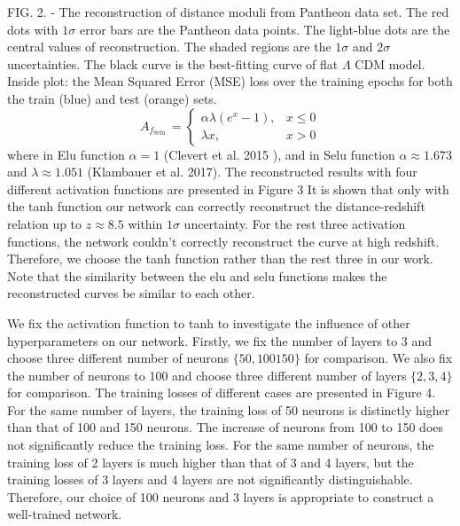 \documentclass[10pt, a4paper]{article}
\begin{document}
FIG. 2. - The reconstruction of distance moduli from Pantheon data set. The red dots with $1 \sigma$ error bars are the Pantheon data points. The light-blue dots are the central values of reconstruction. The shaded regions are the $1 \sigma$ and $2 \sigma$ uncertainties. The black curve is the best-fitting curve of flat $\Lambda$ CDM model. Inside plot: the Mean Squared Error (MSE) loss over the training epochs for both the train (blue) and test (orange) sets.
$$
A_{f_{\text {Selu }}}= \begin{cases}\alpha \lambda\left(e^{x}-1\right), & x \leq 0 \\ \lambda x, & x>0\end{cases}
$$
where in Elu function $\alpha=1$ (Clevert et al. 2015 ), and in Selu function $\alpha \approx 1.673$ and $\lambda \approx 1.051$ (Klambauer et al. 2017). The reconstructed results with four different activation functions are presented in Figure 3 It is shown that only with the tanh function our network can correctly reconstruct the distance-redshift relation up to $z \approx 8.5$ within $1 \sigma$ uncertainty. For the rest three activation functions, the network couldn't correctly reconstruct the curve at high redshift. Therefore, we choose the tanh function rather than the rest three in our work. Note that the similarity between the elu and selu functions makes the reconstructed curves be similar to each other.

We fix the activation function to tanh to investigate the influence of other hyperparameters on our network. Firstly, we fix the number of layers to 3 and choose three different number of neurons $\{50,100150\}$ for comparison. We also fix the number of neurons to 100 and choose three different number of layers $\{2,3,4\}$ for comparison. The training losses of different cases are presented in Figure 4. For the same number of layers, the training loss of 50 neurons is distinctly higher than that of 100 and 150 neurons. The increase of neurons from 100 to 150 does not significantly reduce the training loss. For the same number of neurons, the training loss of 2 layers is much higher than that of 3 and 4 layers, but the training losses of 3 layers and 4 layers are not significantly distinguishable. Therefore, our choice of 100 neurons and 3 layers is appropriate to construct a well-trained network.
\end{document}
